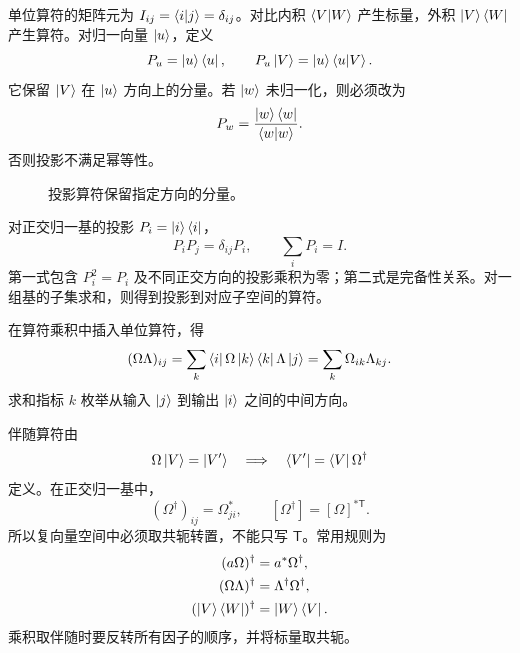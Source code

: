 
单位算符的矩阵元为 $I_{ij}=\left\langle i \middle| j \right\rangle=\delta_{ij}$。对比内积 $\left\langle V \middle| W \right\rangle$ 产生标量，外积 $\left|V\right\rangle\left\langle W\right|$ 产生算符。对归一向量 $\left|u\right\rangle$，定义
\begin{equation}
  P_u=\left|u\right\rangle\left\langle u\right|,
  \qquad
  P_u\left|V\right\rangle=\left|u\right\rangle\left\langle u \middle| V \right\rangle.
  \label{eq:QM-C01-S06-projection}
\end{equation}
它保留 $\left|V\right\rangle$ 在 $\left|u\right\rangle$ 方向上的分量。若 $\left|w\right\rangle$ 未归一化，则必须改为
\[
  P_w=\frac{\left|w\right\rangle\left\langle w\right|}{\left\langle w \middle| w \right\rangle}.
\]
否则投影不满足幂等性。

\begin{figure}[htbp]
  \centering
  \caption{投影算符保留指定方向的分量。}
  \label{fig:QM-C01-S06-projection}
\end{figure}

对正交归一基的投影 $P_i=\left|i\right\rangle\left\langle i\right|$，
\begin{equation}
  P_iP_j=\delta_{ij}P_i,
  \qquad
  \sum_iP_i=I.
  \label{eq:QM-C01-S06-projection-algebra}
\end{equation}
第一式包含 $P_i^2=P_i$ 及不同正交方向的投影乘积为零；第二式是完备性关系。对一组基的子集求和，则得到投影到对应子空间的算符。


在算符乘积中插入单位算符，得
\begin{equation}
  (\Omega\Lambda)_{ij}
  =\sum_k\left\langle i\right|\Omega\left|k\right\rangle\left\langle k\right|\Lambda\left|j\right\rangle
  =\sum_k\Omega_{ik}\Lambda_{kj}.
  \label{eq:QM-C01-S06-product-matrix}
\end{equation}
求和指标 $k$ 枚举从输入 $\left|j\right\rangle$ 到输出 $\left|i\right\rangle$ 之间的中间方向。

伴随算符由
\begin{equation}
  \Omega\left|V\right\rangle=\left|V'\right\rangle
  \quad\Longrightarrow\quad
  \left\langle V'\right|=\left\langle V\right|\Omega^\dagger
  \label{eq:QM-C01-S06-adjoint-definition}
\end{equation}
定义。在正交归一基中，
\begin{equation}
  (\Omega^\dagger)_{ij}=\Omega_{ji}^*,
  \qquad
  [\Omega^\dagger]=[\Omega]^{*\mathsf T}.
  \label{eq:QM-C01-S06-adjoint-matrix}
\end{equation}
所以复向量空间中必须取共轭转置，不能只写 $\mathsf T$。常用规则为
\begin{align*}
  (a\Omega)^\dagger&=a^*\Omega^\dagger,\\
  (\Omega\Lambda)^\dagger&=\Lambda^\dagger\Omega^\dagger,\\
  (\left|V\right\rangle\left\langle W\right|)^\dagger&=\left|W\right\rangle\left\langle V\right|.
\end{align*}
乘积取伴随时要反转所有因子的顺序，并将标量取共轭。

